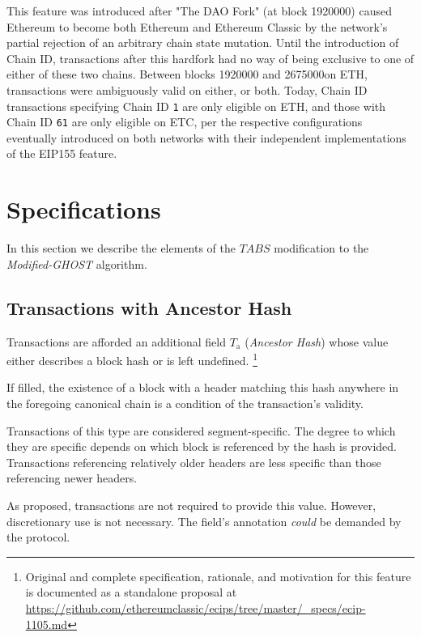 \documentclass[11pt]{article}
\theoremstyle{plain}
\newcommand{\mghost}{\textit{Modified-GHOST }}
\begin{document}
This feature was introduced after "The DAO Fork" (at block 1920000) caused
Ethereum to become both Ethereum and Ethereum Classic by the network's partial rejection of an arbitrary chain state mutation.
Until the introduction of Chain ID, transactions after this hardfork had no way
of being exclusive to one of either of these two chains.
Between blocks 1920000 and 2675000on ETH, transactions were ambiguously valid on either, or both.
Today, Chain ID transactions specifying Chain ID \texttt{1} are only eligible
on ETH, and those with Chain ID \texttt{61} are only eligible on ETC, per the
respective configurations eventually introduced on both networks with their
independent implementations of the EIP155 feature.



\pagebreak
\section{\normalsize{Specifications}}\label{sec: specs}

In this section we describe the elements of the $TABS$ modification to the
\mghost algorithm.

\subsection{\small{Transactions with Ancestor Hash}}

Transactions are afforded an additional field $T_\mathrm{a}$ (\textit{Ancestor
Hash}) whose value either describes a block hash or is left undefined.\nolinebreak
\footnote{Original and complete specification, rationale, and motivation for this feature is
documented as a standalone proposal at \url{https://github.com/ethereumclassic/ecips/tree/master/_specs/ecip-1105.md}}

If filled, the existence of a block with a header matching this hash anywhere
in the foregoing canonical chain is a condition of the transaction's validity.

Transactions of this type are considered segment-specific.
The degree to which they are specific depends on which block is referenced by the hash is provided.
Transactions referencing relatively older headers are less specific than those referencing newer headers.

As proposed, transactions are not required to provide this value.
However, discretionary use is not necessary.
The field's annotation \textit{could} be demanded by the protocol.
\end{document}
